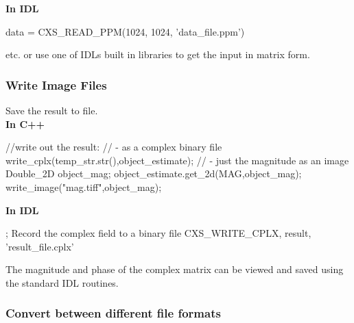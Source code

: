 \documentclass[]{cxs-software}
\begin{document}
{\bf In IDL}
\begin{myverbatim}[language=IDL]
   data = CXS_READ_PPM(1024, 1024, 'data_file.ppm')
\end{myverbatim}
etc. or use one of IDLs built in libraries to get
the input in matrix form.


\subsubsection{Write Image Files}
\label{subsub:write_images}
Save the result to file.\\
                          
{\bf In C++} 
\begin{myverbatim}[language=C++]
  //write out the result:
  // - as a complex binary file
  write_cplx(temp_str.str(),object_estimate);
  // - just the magnitude as an image
  Double_2D object_mag;
  object_estimate.get_2d(MAG,object_mag);
  write_image("mag.tiff",object_mag);
\end{myverbatim}
                          
{\bf In IDL}
\begin{myverbatim}[language=IDL]
  ; Record the complex field to a binary file
  CXS_WRITE_CPLX, result, 'result_file.cplx'
\end{myverbatim}
The magnitude and phase of the complex matrix
can be viewed and saved using the standard IDL
routines.


\subsubsection{Convert between different file formats}
\end{document}
